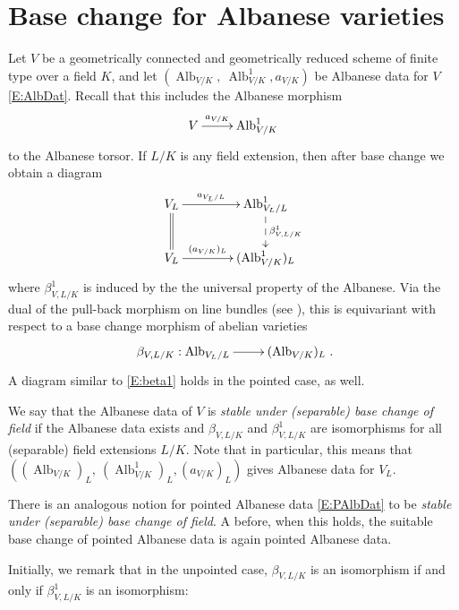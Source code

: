 \documentclass[11pt, reqno]{amsart}
\numberwithin{equation}{section}
\theoremstyle{definition}
\theoremstyle{remark}
\DeclareMathOperator{\alb}{Alb}
\begin{document}
 \section{Base change for Albanese varieties}\label{S:BC}
 
 
 
 
 
 
 
  Let $V$ be a geometrically connected  and geometrically reduced scheme
  of finite type over a field $K$, and let $(\alb_{V/K}, \
 \alb^1_{V/K},a_{V/K} )$ be Albanese data for $V$ \eqref{E:AlbDat}.  Recall that this includes the Albanese morphism 
  $$
\xymatrix{
  V \ar[r]^<>(0.5){a_{V/K}}&  \operatorname{Alb}^1_{V/K}
  }
  $$
  to the Albanese torsor.  
 If $L/K$ is any field extension, then after base change
 we obtain a diagram 
   \begin{equation}\label{E:beta1}
\xymatrix@C=4em{
  V_L \ar[r]^<>(0.5){a_{V_L/L}} \ar@{=}[d]&  \operatorname{Alb}^1_{V_L/L} \ar@{-->}[d]^{\beta^1_{V,L/K}}\\
  V_L \ar[r]^<>(0.5){(a_{V/K})_L}&  (\operatorname{Alb}^1_{V/K})_L\\
  }
  \end{equation}
 where $\beta^1_{V,L/K}$ is induced by the 
   the universal property of the Albanese.
       Via the dual of the pull-back morphism on line bundles (see ), this is  equivariant with respect to a base change morphism of abelian varieties
  \begin{equation}\label{E:beta}
 \xymatrix{\beta_{V,L/K}: \alb_{V_L/L} \ar[r] &(\alb_{V/K})_L}.
 \end{equation}
A diagram similar to \eqref{E:beta1} holds in the pointed case, as well.  


We say that the Albanese data  of $V$ is \emph{stable under (separable) base change of
  field}  if the Albanese data exists and $\beta_{V,L/K}$ and $\beta^1_{V,L/K}$  are isomorphisms  for all
 (separable) field extensions $L/K$.  Note that in particular, this means that
 $((\alb_{V/K})_L, \
 (\alb^1_{V/K})_L,(a_{V/K})_L )$ gives Albanese data for $V_L$.

 There is an analogous notion for pointed Albanese data
 \eqref{E:PAlbDat} to be \emph{stable under (separable) base change of
   field}.  A before, when this holds, the suitable base
 change of pointed Albanese data is again pointed Albanese data.
 

 
 
 
Initially, we remark that in the unpointed case,   $\beta_{V,L/K}$ is an
 isomorphism if and only if  $\beta^1_{V,L/K}$ is an isomorphism:
\end{document}
